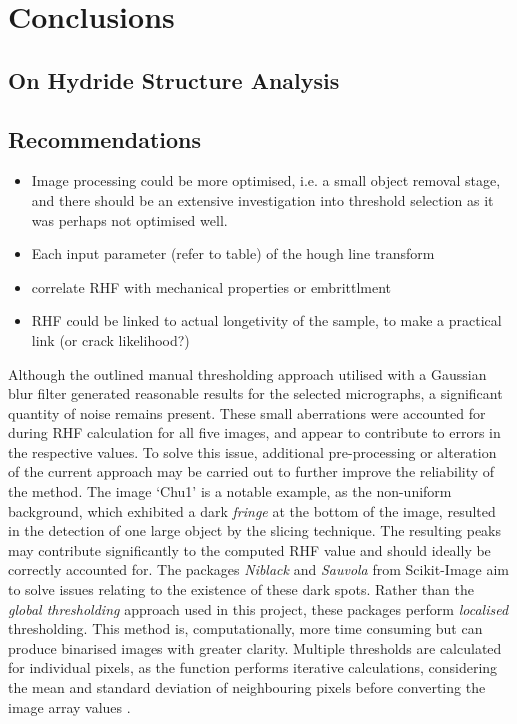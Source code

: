\documentclass{article}
\begin{document}
\section{Conclusions}
\subsection{On Hydride Structure Analysis}

\subsection{Recommendations}
\begin{itemize}
    \item Image processing could be more optimised, i.e. a small object removal stage, and there should be an extensive investigation into threshold selection as it was perhaps not optimised well.
    \item Each input parameter (refer to table) of the hough line transform 
    \item correlate RHF with mechanical properties or embrittlment
    \item RHF could be linked to actual longetivity of the sample, to make a practical link (or crack likelihood?)
\end{itemize}

\noindent Although the outlined manual thresholding approach utilised with a Gaussian blur filter generated reasonable results for the selected micrographs, a significant quantity of noise remains present. These small aberrations were accounted for during RHF calculation for all five images, and appear to contribute to errors in the respective values. To solve this issue, additional pre-processing or alteration of the current approach may be carried out to further improve the reliability of the method. The image ‘Chu1’ is a notable example, as the non-uniform background, which exhibited a dark \textit{fringe} at the bottom of the image, resulted in the detection of one large object by the slicing technique. The resulting peaks may contribute significantly to the computed RHF value and should ideally be correctly accounted for. The packages \textit{Niblack} and \textit{Sauvola} from Scikit-Image aim to solve issues relating to the existence of these dark spots. Rather than the \textit{global thresholding} approach used in this project, these packages perform \textit{localised} thresholding. This method is, computationally, more time consuming but can produce binarised images with greater clarity. Multiple thresholds are calculated for individual pixels, as the function performs iterative calculations, considering the mean and standard deviation of neighbouring pixels before converting the image array values \cite{ScikitimageC}.
\end{document}
